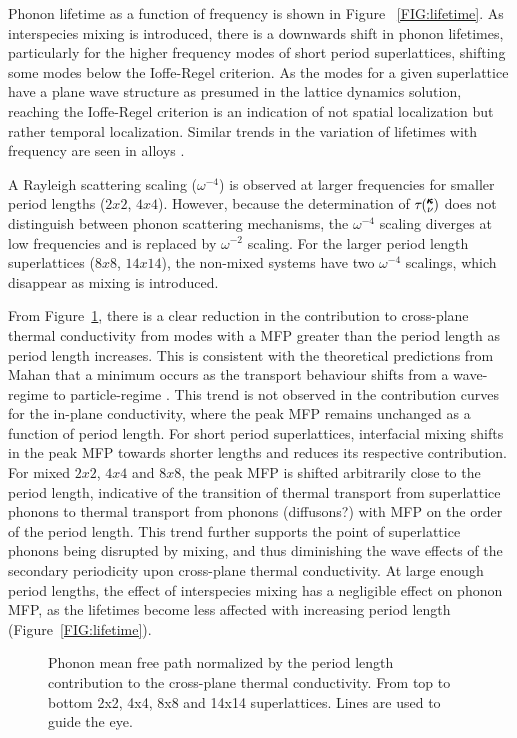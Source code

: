 \documentclass[aps,prb,preprint,preprintnumbers,amsmath,amssymb,floatfix,superscriptaddress]{revtex4}
\newcommand{\kv}{\mspace{-4.0mu}\left(\mspace{-8.0mu}
\begin{smallmatrix}&\pmb{\kappa} \\&\nu\end{smallmatrix}
\mspace{-3.0mu}\right)}
\begin{document}
Phonon lifetime as a function of frequency is shown in Figure ~\ref{FIG:lifetime}. As interspecies mixing is introduced, there is a downwards shift in phonon lifetimes, particularly for the higher frequency modes of short period superlattices, shifting some modes below the Ioffe-Regel criterion. As the modes for a given superlattice have a plane wave structure as presumed in the lattice dynamics solution, reaching the Ioffe-Regel criterion is an indication of not spatial localization but rather temporal localization. Similar trends in the variation of lifetimes with frequency are seen in alloys \cite{jason}.

A Rayleigh scattering scaling ($\omega^{-4}$) is observed at larger frequencies for smaller period lengths ($2x2$, $4x4$). However, because the determination of $\tau\kv$ does not distinguish between phonon scattering mechanisms, the $\omega^{-4}$ scaling diverges at low frequencies and is replaced by $\omega^{-2}$ scaling. For the larger period length superlattices ($8x8$, $14x14$), the non-mixed systems have two $\omega^{-4}$ scalings, which disappear as mixing is introduced.

From Figure~\ref{FIG:MFP_cp}, there is a clear reduction in the contribution to cross-plane thermal conductivity from modes with a MFP greater than the period length as period length increases. This is consistent with the theoretical predictions from Mahan that a minimum occurs as the transport behaviour shifts from a wave-regime to particle-regime \cite{PhysRevLett.84.927,PhysRevB.56.10754}. This trend is not observed in the contribution curves for the in-plane conductivity, where the peak MFP remains unchanged as a function of period length. For short period superlattices, interfacial mixing shifts in the peak MFP towards shorter lengths and reduces its respective contribution. For mixed $2x2$, $4x4$ and $8x8$, the peak MFP is shifted arbitrarily close to the period length, indicative of the transition of thermal transport from superlattice phonons to thermal transport from phonons (diffusons?) with MFP on the order of the period length. This trend further supports the point of superlattice phonons being disrupted by mixing, and thus diminishing the wave effects of the secondary periodicity upon cross-plane thermal conductivity. At large enough period lengths, the effect of interspecies mixing has a negligible effect on phonon MFP, as the lifetimes become less affected with increasing period length (Figure~\ref{FIG:lifetime}).

\begin{figure}%
\begin{center}
\renewcommand{\figure}{Fig.}
\caption{Phonon mean free path normalized by the period length contribution to the cross-plane thermal conductivity. From top to bottom 2x2, 4x4, 8x8 and 14x14 superlattices. Lines are used to guide the eye.}
\label{FIG:MFP_cp}
\end{center}
\end{figure}
\end{document}
